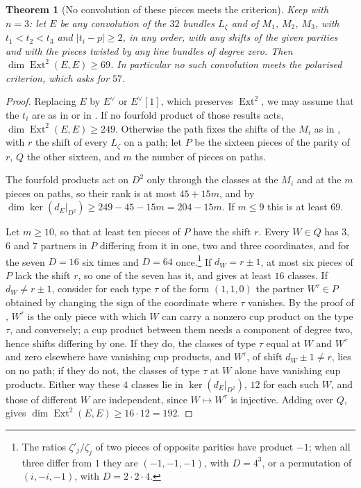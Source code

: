 \documentclass[11pt,reqno]{amsart}
\theoremstyle{plain}
\newtheorem{theorem}{Theorem}[section]
\theoremstyle{definition}
\theoremstyle{remark}
\DeclareMathOperator{\Ext}{Ext}
\begin{document}
\begin{theorem}[No convolution of these pieces meets the criterion]
\label{thm:noconvolution}
Keep  with $n=3$: let $E$ be any convolution of
the $32$ bundles $L_{\zeta}$ and of $M_{1}$, $M_{2}$, $M_{3}$, with
$t_{1}<t_{2}<t_{3}$ and $|t_{i}-p|\ge2$, in any order, with any shifts of the
given parities and with the pieces twisted by any line bundles of degree
zero. Then $\dim\Ext^{2}(E,E)\ge69$. In particular no such convolution meets
the polarised criterion, which asks for $57$.
\end{theorem}

\begin{proof}
Replacing $E$ by $E^{\vee}$ or $E^{\vee}[1]$, which preserves $\Ext^{2}$, we
may assume that the $t_{i}$ are as in  or in
. If no fourfold product of those results acts,
$\dim\Ext^{2}(E,E)\ge249$. Otherwise the path fixes the shifts of the
$M_{i}$ as in , with $r$ the shift of every $L_{\zeta}$
on a path; let $P$ be the sixteen pieces of the parity of $r$, $Q$ the
other sixteen, and $m$ the number of pieces on paths.

The fourfold products act on $D^{2}$ only through the classes at the
$M_{i}$ and at the $m$ pieces on paths, so their rank is at most $45+15m$,
and by 
$\dim\ker(d_{E}|_{D^{2}})\ge249-45-15m=204-15m$. If $m\le9$ this is at
least $69$.

Let $m\ge10$, so that at least ten pieces of $P$ have the shift $r$. Every
$W\in Q$ has $3$, $6$ and $7$ partners in $P$ differing from it in one, two
and three coordinates, and for the seven $D=16$ six times and $D=64$
once.\footnote{The ratios $\zeta'_{j}/\zeta_{j}$ of two pieces of opposite
parities have product $-1$; when all three differ from $1$ they are
$(-1,-1,-1)$, with $D=4^{3}$, or a permutation of $(i,-i,-1)$, with
$D=2\cdot2\cdot4$.} If $d_{W}=r\pm1$, at most six pieces of $P$ lack the
shift $r$, so one of the seven has it, and  gives at least
$16$ classes. If $d_{W}\ne r\pm1$, consider for each type $\tau$ of the form
$(1,1,0)$ the partner $W^{\tau}\in P$ obtained by changing the sign of the
coordinate where $\tau$ vanishes. By the proof of ,
$W^{\tau}$ is the only piece with which $W$ can carry a nonzero cup product
on the type $\tau$, and conversely; a cup product between them needs a
component of degree two, hence shifts differing by one. If they do, the
classes of type $\tau$ equal at $W$ and $W^{\tau}$ and zero elsewhere have
vanishing cup products, and $W^{\tau}$, of shift $d_{W}\pm1\ne r$, lies on no
path; if they do not, the classes of type $\tau$ at $W$ alone have vanishing
cup products. Either way these $4$ classes lie in $\ker(d_{E}|_{D^{2}})$,
$12$ for each such $W$, and those of different $W$ are independent, since
$W\mapsto W^{\tau}$ is injective. Adding over $Q$, 
gives $\dim\Ext^{2}(E,E)\ge16\cdot12=192$.
\end{proof}
\end{document}
